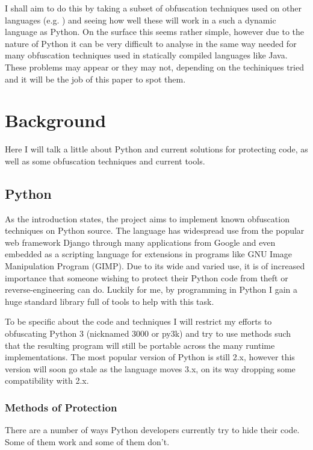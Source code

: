 \documentclass{report}
\begin{document}
I shall aim to do this by taking a subset of obfuscation techniques used on other languages (e.g.
\cite{taxobftrans}) and seeing how well these will work in a such a dynamic language as Python. On the
surface this seems rather simple, however due to the nature of Python it can be very difficult to analyse
\cite[p13]{staticanal} in the same way needed for many obfuscation techniques used in statically compiled
languages like Java. These problems may appear or they may not, depending on the techiniques tried and it
will be the job of this paper to spot them.

\section{Background}

Here I will talk a little about Python and current solutions for protecting code, as well as some
obfuscation techniques and current tools.

\subsection{Python}

As the introduction states, the project aims to implement known obfuscation techniques on Python source.
The language has widespread use from the popular web framework Django\cite{django} through many applications
from Google\cite{pygoogle} and even embedded as a scripting language for extensions in programs like GNU
Image Manipulation Program (GIMP)\cite{gimp}. Due to its wide and varied use, it is of increased importance
that someone wishing to protect their Python code from theft or reverse-engineering can do. Luckily for me,
by programming in Python I gain a huge standard library full of tools to help with this task. 

To be specific about the code and techniques I will restrict my efforts to obfuscating Python 3 (nicknamed
3000 or py3k) and try to use methods such that the resulting program will still be portable across the many
runtime implementations. The most popular version of Python is still 2.x, however this version will soon go
stale as the language moves 3.x, on its way dropping some compatibility with 2.x.

\subsubsection{Methods of Protection}

There are a number of ways Python developers currently try to hide their code. Some of them work and some of
them don't.
\end{document}

